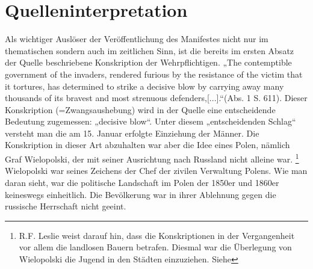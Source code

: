 \documentclass{../../sem_paper}
\begin{document}
\section{Quelleninterpretation}
Als wichtiger Auslöser der Veröffentlichung des Manifestes nicht nur im thematischen sondern auch
im zeitlichen Sinn, ist die bereits im ersten Absatz der Quelle beschriebene Konskription der
Wehrpflichtigen. „The contemptible government of the invaders, rendered furious by the resistance
of the victim that it tortures, has determined to strike a decisive blow by carrying away many
thousands of its bravest and most strenuous defenders,[...].“(Abs. 1 S. 611). Dieser Konskription
(=Zwangsaushebung) wird in der Quelle eine entscheidende Bedeutung zugemessen: „decisive
blow“. Unter diesem „entscheidenden Schlag“ versteht man die am 15. Januar erfolgte Einziehung
der Männer. Die Konskription in dieser Art abzuhalten war aber die Idee eines Polen, nämlich Graf
Wielopolski, der mit seiner Ausrichtung nach Russland nicht alleine war. \footnote{
R.F. Leslie weist darauf hin, dass die Konskriptionen in der Vergangenheit vor allem die landlosen Bauern betrafen.
Diesmal war die Überlegung von Wielopolski die Jugend in den Städten einzuziehen. 
Siehe }
Wielopolski war seines
Zeichens der Chef der zivilen Verwaltung Polens. Wie man daran sieht, war die politische
Landschaft im Polen der 1850er und 1860er keineswegs einheitlich. Die Bevölkerung war in ihrer
Ablehnung gegen die russische Herrschaft nicht geeint.
\end{document}

